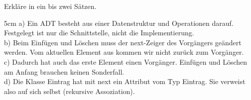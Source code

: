 \question[4]
Erkläre in ein bis zwei Sätzen.
\begin{solutionbox}{5cm}
a) Ein ADT besteht aus einer Datenstruktur und Operationen darauf. Festgelegt ist nur die Schnittstelle, nicht die Implementierung. \\
b) Beim Einfügen und Löschen muss der next-Zeiger des Vorgängers geändert werden. Vom aktuellen Element aus kommen wir
nicht zurück zum Vorgänger. \\
c) Dadurch hat auch das erste Element einen Vorgänger. Einfügen und Löschen am Anfang brauchen keinen Sonderfall. \\
d) Die Klasse Eintrag hat mit next ein Attribut vom Typ Eintrag. Sie verweist also auf sich selbst (rekursive Assoziation).
\end{solutionbox}
